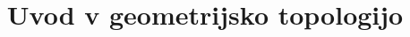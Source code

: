 \documentclass[11pt, a4paper]{article}
\begin{document}
\title{Uvod v geometrijsko topologijo}
\maketitle

\newpage


\newpage


\newpage

\end{document}
